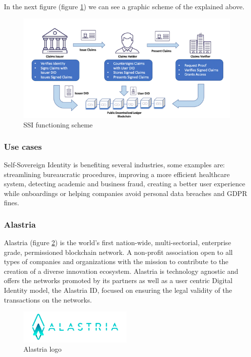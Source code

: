 \documentclass[a4paper, 12pt]{article} %
\begin{document}
                    In the next figure (figure \ref{fig:ssi-scheme}) we can see a graphic scheme of the explained above.
                    \begin{figure}[h]
                        \centering
                        \includegraphics[width=1.0\textwidth]{how-to-ssi.png}
                        \caption{SSI functioning scheme}
                        \label{fig:ssi-scheme}
                    \end{figure}

            \subsubsection{Use cases}
                Self-Sovereign Identity is benefiting several industries\cite{ssi-guide}, some examples are: streamlining bureaucratic procedures, improving a more efficient healthcare system, detecting academic and business fraud, creating a better user experience while onboardings or helping companies avoid personal data breaches and GDPR\cite{gdpr} fines.

            \subsubsection{Alastria}
                Alastria (figure \ref{fig:alastria_logo}) is the world’s first nation-wide, multi-sectorial, enterprise grade, permissioned blockchain network. A non-profit association open to all types of companies and organizations with the mission to contribute to the creation of a diverse innovation ecosystem. Alastria is technology agnostic and offers the networks promoted by its partners as well as a user centric Digital Identity model, the Alastria ID, focused on ensuring the legal validity of the transactions on the networks.
                \begin{figure}[h]
                    \centering
                    \includegraphics[width=0.5\textwidth]{alastria-logo.png}
                    \caption{Alastria logo}
                    \label{fig:alastria_logo}
                \end{figure}
\end{document}
